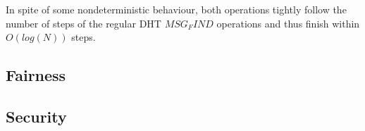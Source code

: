 In spite of some nondeterministic behaviour, both operations tightly follow the number of steps of the regular DHT $MSG_FIND$ operations and thus finish within $O(log(N))$ steps.

\subsection{Fairness}


\subsection{Security}